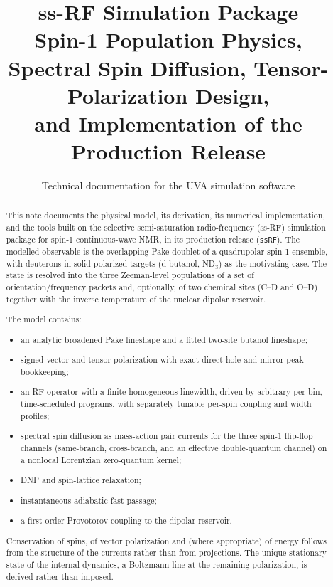 \documentclass[11pt]{article}
\title{\textbf{ss-RF Simulation Package}\\[0.4em]
\large Spin-1 Population Physics, Spectral Spin Diffusion, Tensor-Polarization Design,\\
and Implementation of the Production Release}
\author{Technical documentation for the UVA simulation software}
\date{}
\begin{document}
\sloppy
\maketitle

\begin{abstract}
This note documents the physical model, its derivation, its numerical implementation, and the
tools built on the selective semi-saturation radio-frequency (ss-RF) simulation package for
spin-1 continuous-wave NMR, in its production release (\texttt{ssRF}). The modelled observable
is the overlapping Pake doublet of a quadrupolar spin-1 ensemble, with deuterons in solid
polarized targets (d-butanol, ND$_3$) as the motivating case. The state is resolved into the
three Zeeman-level populations of a set of orientation/frequency packets and, optionally, of
two chemical sites (C--D and O--D) together with the inverse temperature of the nuclear dipolar
reservoir.

The model contains:
\begin{itemize}
\item an analytic broadened Pake lineshape and a fitted two-site butanol lineshape;
\item signed vector and tensor polarization with exact direct-hole and mirror-peak bookkeeping;
\item an RF operator with a finite homogeneous linewidth, driven by arbitrary per-bin, time-scheduled
programs, with separately tunable per-spin coupling and width profiles;
\item spectral spin diffusion as mass-action pair currents for the three spin-1 flip-flop channels
(same-branch, cross-branch, and an effective double-quantum channel) on a nonlocal Lorentzian
zero-quantum kernel;
\item DNP and spin-lattice relaxation;
\item instantaneous adiabatic fast passage;
\item a first-order Provotorov coupling to the dipolar reservoir.
\end{itemize}
Conservation of spins, of vector polarization and (where appropriate) of energy follows from the
structure of the currents rather than from projections. The unique stationary state of the
internal dynamics, a Boltzmann line at the remaining polarization, is derived rather than imposed.


\end{abstract}
\end{document}
